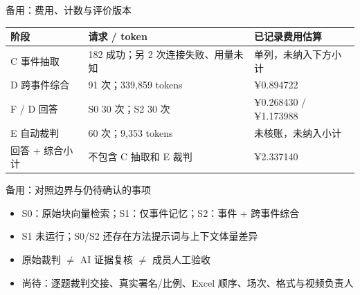 \documentclass[aspectratio=169,10pt]{beamer}
\begin{document}
\appendix
{}
\begin{frame}{备用：费用、计数与评价版本}
\small
\begin{tabularx}{\linewidth}{@{}YYY@{}}\toprule
阶段 & 请求 / token & 已记录费用估算\\[1.5mm]\midrule
C 事件抽取 & 182 成功；另 2 次连接失败、用量未知 & 单列，未纳入下方小计\\[1.5mm]
D 跨事件综合 & 91 次；339,859 tokens & ¥0.894722\\[1.5mm]
F / D 回答 & S0 30 次；S2 30 次 & ¥0.268430 / ¥1.173988\\[1.5mm]
E 自动裁判 & 60 次；9,353 tokens & 未核账，未纳入小计\\[1.5mm]
回答 + 综合小计 & 不包含 C 抽取和 E 裁判 & ¥2.337140\\[1.5mm]
\bottomrule\end{tabularx}
\note{}
\end{frame}
\begin{frame}{备用：对照边界与仍待确认的事项}
\small
\begin{itemize}
\item S0：原始块向量检索；S1：仅事件记忆；S2：事件 + 跨事件综合\vspace{4mm}
\item S1 未运行；S0/S2 还存在方法提示词与上下文体量差异\vspace{4mm}
\item 原始裁判 $\ne$ AI 证据复核 $\ne$ 成员人工验收\vspace{4mm}
\item 尚待：逐题裁判交接、真实署名/比例、Excel 顺序、场次、格式与视频负责人\vspace{4mm}
\end{itemize}
\note{}
\end{frame}
\end{document}
